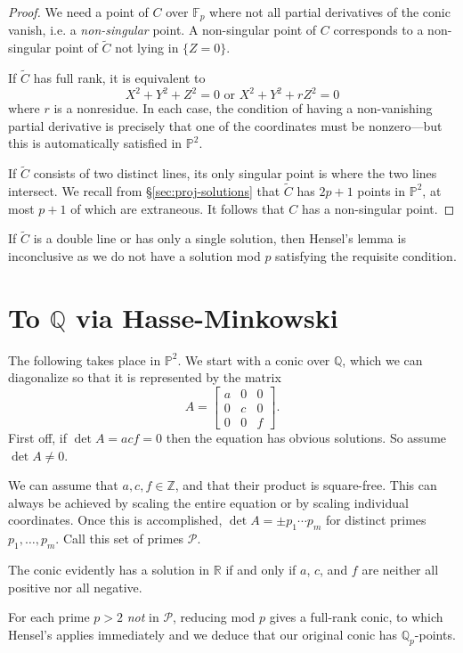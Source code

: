 \documentclass[10pt,a4paper]{amsart}
\numberwithin{equation}{section}
\numberwithin{figure}{section}
\theoremstyle{definition}
\theoremstyle{plain}
\theoremstyle{remark}
\theoremstyle{plain}
\theoremstyle{definition}
\theoremstyle{plain}
\theoremstyle{plain}
\renewcommand{\P}{\mathbb{P}}
\newcommand{\F}{\mathbb{F}}
\newcommand{\Z}{\mathbb{Z}}
\newcommand{\Q}{\mathbb{Q}}
\newcommand{\R}{\mathbb{R}}
\begin{document}
	\begin{proof}
		We need a point of $C$ over $\F_p$ where not all partial derivatives of the conic vanish, i.e. a \emph{non-singular} point. A non-singular point of $C$ corresponds to a non-singular point of $\widetilde{C}$ not lying in $\{Z=0\}$.
		
		If $\widetilde{C}$ has full rank, it is equivalent to
		\[
		X^2 + Y^2 + Z^2 = 0 \text{ or } X^2 + Y^2 + rZ^2 = 0
		\]
		where $r$ is a nonresidue. In each case, the condition of having a non-vanishing partial derivative is precisely that one of the coordinates must be nonzero---but this is automatically satisfied in $\P^2$.
		
		If $\widetilde{C}$ consists of two distinct lines, its only singular point is where the two lines intersect. We recall from \S\ref{sec:proj-solutions} that $\widetilde{C}$ has $2p+1$ points in $\P^2$, at most $p+1$ of which are extraneous. It follows that $C$ has a non-singular point.
	\end{proof}
	If $\widetilde{C}$ is a double line or has only a single solution, then Hensel's lemma is inconclusive as we do not have a solution mod $p$ satisfying the requisite condition.

    \section{To $\mathbb{Q}$ via Hasse-Minkowski}\label{sec:hasse-minkowski}
    The following takes place in $\P^2$. We start with a conic over $\Q$, which we can diagonalize so that it is represented by the matrix
    \[
    	A= \begin{bmatrix}
    		a & 0 & 0\\
    		0 & c & 0\\
    		0 & 0 & f
    	\end{bmatrix}.
    \]
    First off, if $\det A = acf = 0$ then the equation has obvious solutions. So assume $\det A \neq 0$.
    
    We can assume that $a,c,f \in \Z$, and that their product is square-free. This can always be achieved by scaling the entire equation or by scaling individual coordinates. Once this is accomplished, $\det A = \pm p_1\cdots p_m$ for distinct primes $p_1,\ldots,p_m$. Call this set of primes $\mathcal{P}$.
    
    The conic evidently has a solution in $\R$ if and only if $a$, $c$, and $f$ are neither all positive nor all negative.

    For each prime $p>2$ \emph{not} in $\mathcal{P}$, reducing mod $p$ gives a full-rank conic, to which Hensel's applies immediately and we deduce that our original conic has $\Q_p$-points.
    
\end{document}
